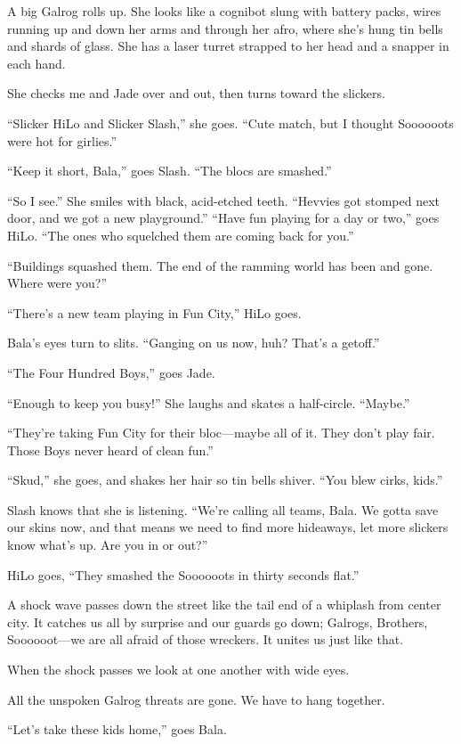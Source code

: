 A big Galrog rolls up. She looks like a cognibot slung with battery packs, wires running up and down her arms and through her afro, where she's hung tin bells and shards of glass. She has a laser turret strapped to her head and a snapper in each hand.

She checks me and Jade over and out, then turns toward the slickers.

“Slicker HiLo and Slicker Slash,” she goes. “Cute match, but I thought Soooooots were hot for girlies.”

“Keep it short, Bala,” goes Slash. “The blocs are smashed.”

“So I see.” She smiles with black, acid-etched teeth. “Hevvies got stomped next door, and we got a new playground.”
“Have fun playing for a day or two,” goes HiLo. “The ones who squelched them are coming back for you.”

“Buildings squashed them. The end of the ramming world has been and gone. Where were you?”

“There's a new team playing in Fun City,” HiLo goes.

Bala's eyes turn to slits. “Ganging on us now, huh? That's a getoff.”

“The Four Hundred Boys,” goes Jade.

“Enough to keep you busy!” She laughs and skates a half-circle. “Maybe.”

“They're taking Fun City for their bloc—maybe all of it. They don't play fair. Those Boys never heard of clean fun.”

“Skud,” she goes, and shakes her hair so tin bells shiver. “You blew cirks, kids.”

Slash knows that she is listening. “We're calling all teams, Bala. We gotta save our skins now, and that means we need to find more hideaways, let more slickers know what's up. Are you in or out?”

HiLo goes, “They smashed the Soooooots in thirty seconds flat.”

A shock wave passes down the street like the tail end of a whiplash from center city. It catches us all by surprise and our guards go down; Galrogs, Brothers, Soooooot—we are all afraid of those wreckers. It unites us just like that.

When the shock passes we look at one another with wide eyes.

All the unspoken Galrog threats are gone. We have to hang together.

“Let's take these kids home,” goes Bala.

